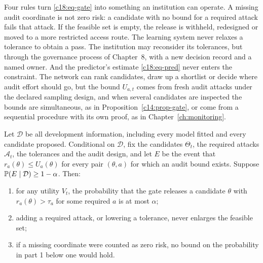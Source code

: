 Four rules turn \eqref{c18:eq-gate} into something an institution can operate. A missing audit coordinate is not zero risk: a candidate with no bound for a required attack fails that attack. If
the feasible set is empty, the release is withheld, redesigned or moved to a more restricted
access route. The learning system never relaxes a tolerance to obtain a pass. The institution
may reconsider its tolerances, but through the governance process of Chapter~8, with a new
decision record and a named owner. And the predictor's estimate \eqref{c18:eq-pred} never enters the
constraint. The network can rank candidates, draw up a shortlist or decide where audit
effort should go, but the bound $U_{a,t}$ comes from fresh audit attacks under the declared sampling design, and when several candidates are inspected the bounds are simultaneous, as in
Proposition~\ref{c14:prop-gate}, or come from a sequential procedure with its own proof, as in Chapter~\ref{ch:monitoring}.

\begin{proposition}\label{c18:prop-gate}
Let $\mathcal D$ be all development information, including every model fitted and every candidate proposed. Conditional on $\mathcal D$, fix the candidates $\Theta_t$, the required attacks $\mathcal A_t$,
the tolerances and the audit design, and let $E$ be the event that $r_a(\theta)\le U_a(\theta)$ for every pair $(\theta,a)$
for which an audit bound exists. Suppose $\mathbb{P}(E\mid\mathcal D)\ge 1-\alpha$. Then:
\begin{enumerate}
\item for any utility $V_t$, the probability that the gate releases a candidate $\theta$ with $r_a(\theta)>\tau_a$ for some required $a$ is at most $\alpha$;
\item adding a required attack, or lowering a tolerance, never enlarges the feasible set;
\item if a missing coordinate were counted as zero risk, no bound on the probability in part 1 below one would hold.
\end{enumerate}
\end{proposition}

